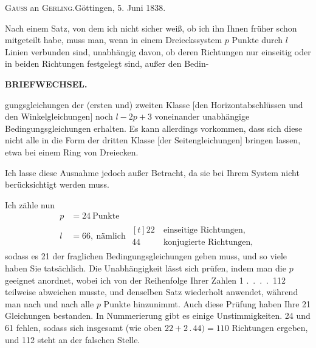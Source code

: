 \bigskip
\begin{center}\textsc{Gauss} an \textsc{Gerling}.\quad Göttingen, 5. Juni 1838.\end{center}

Nach einem Satz, von dem ich nicht sicher weiß, ob ich ihn Ihnen früher
schon mitgeteilt habe, muss man, wenn in einem Dreieckssystem $p$ Punkte
durch $l$ Linien verbunden sind, unabhängig davon, ob deren Richtungen
nur einseitig oder in beiden Richtungen festgelegt sind, außer den Bedin-\par
\makeatletter
\def\ps@gaussIXfortyonestar{\def\@oddhead{}\def\@evenhead{}\def\@oddfoot{\hfil41\textsuperscript{*}\hspace{2em}}\let\@evenfoot\@oddfoot}
\makeatother
\thispagestyle{gaussIXfortyonestar}
\clearpage
{}\hfill\textbf{BRIEFWECHSEL.}\par\medskip
\noindent gungsgleichungen der (ersten und) zweiten Klasse [den Horizontabschlüssen
und den Winkelgleichungen] noch $l-2p+3$ voneinander unabhängige Bedingungsgleichungen
erhalten.  Es kann allerdings vorkommen, dass
sich diese nicht alle in die Form der dritten Klasse [der Seitengleichungen]
bringen lassen, etwa bei einem Ring von Dreiecken.
\begin{center}
\end{center}

Ich lasse diese Ausnahme jedoch außer Betracht, da sie bei Ihrem System
nicht berücksichtigt werden muss.

Ich zähle nun
\[
\begin{aligned}
p&=24\ \text{Punkte}\\
l&=66,\ \text{nämlich }\begin{aligned}[t]22\ &\text{einseitige Richtungen,}\\44\ &\text{konjugierte Richtungen,}\end{aligned}
\end{aligned}
\]
sodass es 21 der fraglichen Bedingungsgleichungen geben muss, und so viele
haben Sie tatsächlich. Die Unabhängigkeit lässt sich prüfen, indem man die
$p$ geeignet anordnet, wobei ich von der Reihenfolge Ihrer Zahlen
1 .\ .\ .\ .\ 112 teilweise abweichen musste, und denselben Satz wiederholt
anwendet, während man nach und nach alle $p$ Punkte hinzunimmt. Auch diese
Prüfung haben Ihre 21 Gleichungen bestanden. In 
Nummerierung gibt es einige Unstimmigkeiten. 24 und 61 fehlen, sodass sich
insgesamt (wie oben $22+2\mathbin{.}44)=110$ Richtungen ergeben, und 112
steht an der falschen Stelle.

